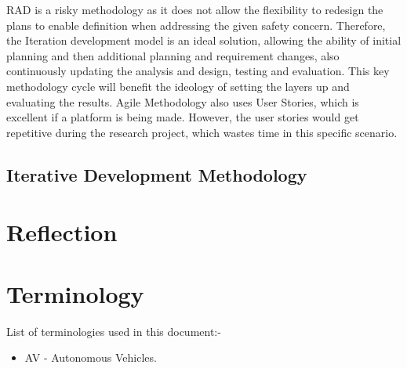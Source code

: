 \documentclass[12pt]{report} %
\begin{document}
	RAD is a risky methodology as it does not allow the flexibility to redesign the plans to enable definition when addressing the given safety concern. Therefore, the Iteration development model is an ideal solution, allowing the ability of initial planning and then additional planning and requirement changes, also continuously updating the analysis and design, testing and evaluation. This key methodology cycle will benefit the ideology of setting the layers up and evaluating the results. Agile Methodology also uses User Stories, which is excellent if a platform is being made. However, the user stories would get repetitive during the research project, which wastes time in this specific scenario.

	\section{Iterative Development Methodology}

\chapter{Reflection}

\chapter*{Terminology}
List of terminologies used in this document:-
\begin{itemize}
	\item AV - Autonomous Vehicles.
\end{itemize}


\clearpage
\nocite{*}
\small{
	}


\end{document}
